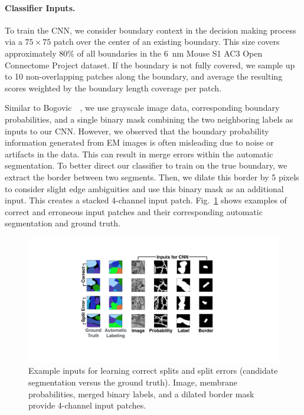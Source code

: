 \paragraph{Classifier Inputs.} To train the CNN, we consider boundary context in the decision making process via a $75\times75$ patch over the center of an existing boundary. This size covers approximately $80\%$ of all boundaries in the 6~nm Mouse S1 AC3 Open Connectome Project dataset. If the boundary is not fully covered, we sample up to 10 non-overlapping patches along the boundary, and average the resulting scores weighted by the boundary length coverage per patch.

Similar to Bogovic~\etal~\cite{BogovicHJ13}, we use grayscale image data, corresponding boundary probabilities, and a single binary mask combining the two neighboring labels as inputs to our CNN. However, we observed that the boundary probability information generated from EM images is often misleading due to noise or artifacts in the data. This can result in merge errors within the automatic segmentation. To better direct our classifier to train on the true boundary, we extract the border between two segments. Then, we dilate this border by 5 pixels to consider slight edge ambiguities and use this binary mask as an additional input. This creates a stacked 4-channel input patch. Fig.~\ref{fig:cnn_inputs} shows examples of correct and erroneous input patches and their corresponding automatic segmentation and ground truth.

\begin{figure}[t]
\centering
\includegraphics[width=\linewidth]{gfx/cnn_inputs.pdf}
\caption{Example inputs for learning correct splits and split errors (candidate segmentation versus the ground truth). Image, membrane probabilities, merged binary labels, and a dilated border mask provide 4-channel input patches.}
\label{fig:cnn_inputs}
\end{figure}


